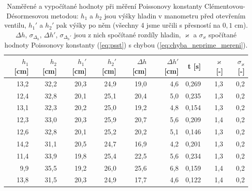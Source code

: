 \documentclass[english]{article}
\begin{document}
\begin{table}[htbp]
  \centering
    \begin{tabular}{|r|r|r|r|r|r|r|r|r|}
    \hline
    $h_1$ [cm] & $h_2$ [cm] & $h_1'$ [cm] & $h_2'$ [cm] & $\Delta h$ [cm] & $\Delta h'$ [cm] & t [s] & $\varkappa$ [-] & $\sigma_\varkappa$ [-] \bigstrut\\
    \hline
    13,2  & 32,2  & 20,3  & 24,9  & 19,0  & 4,6   & 0,269 & 1,3   & 0,2 \bigstrut\\
    \hline
    12,4  & 32,8  & 20,1  & 25,1  & 20,4  & 5,0   & 0,235 & 1,3   & 0,2 \bigstrut\\
    \hline
    13,1  & 32,3  & 20,2  & 25,0  & 19,2  & 4,8   & 0,154 & 1,3   & 0,2 \bigstrut\\
    \hline
    12,3  & 33,0  & 20,3  & 25,9  & 20,7  & 5,6   & 0,209 & 1,4   & 0,2 \bigstrut\\
    \hline
    12,6  & 32,8  & 20,1  & 25,2  & 20,2  & 5,1   & 0,146 & 1,3   & 0,2 \bigstrut\\
    \hline
    14,2  & 31,1  & 20,5  & 24,7  & 16,9  & 4,2   & 0,201 & 1,3   & 0,2 \bigstrut\\
    \hline
    11,4  & 33,9  & 19,8  & 25,4  & 22,5  & 5,6   & 0,234 & 1,3   & 0,2 \bigstrut\\
    \hline
    9,9   & 35,5  & 19,2  & 26,0  & 25,6  & 6,8   & 0,159 & 1,4   & 0,2 \bigstrut\\
    \hline
    13,8  & 31,5  & 20,3  & 24,9  & 17,7  & 4,6   & 0,122 & 1,4   & 0,2 \bigstrut\\
    \hline
    \end{tabular}%
\caption{Naměřené a vypočítané hodnoty při měření Poissonovy konstanty Clémentovou-Désormesovou metodou: $h_1$ a $h_2$ jsou výšky hladin v manometru před otevřením ventilu, $h_1'$ a $h_2'$ pak výšky po něm (všechny 4 jsme určili s přesností na $0,1$ cm). $\Delta h$, $\sigma_{\Delta_h}$, $\Delta h'$, $\sigma_{\Delta_h'}$ jsou z nich spočítané rozdíly hladin, $\varkappa$ a $\sigma_\varkappa$ spočítané hodnoty Poissonovy konstanty (\ref{eq:psst}) s chybou (\ref{eq:chyba_neprime_mereni}). }
  \label{tab:poisson_clement}%
\end{table}%
\end{document}
